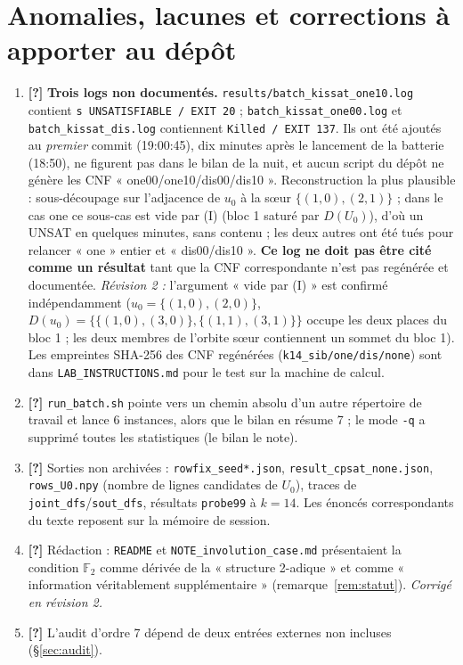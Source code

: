 \documentclass[11pt,a4paper]{article}
\theoremstyle{definition}
\theoremstyle{remark}
\newcommand{\F}{\mathbb{F}}
\newcommand{\st}[1]{\textbf{[#1]}}
\newcommand{\code}[1]{\texttt{#1}}
\begin{document}
\section{Anomalies, lacunes et corrections à apporter au dépôt}\label{sec:anomalies}
\begin{enumerate}[nosep]
\item \st{?} \textbf{Trois logs non documentés.} \code{results/batch\_kissat\_one10.log} contient \code{s UNSATISFIABLE / EXIT 20} ; \code{batch\_kissat\_one00.log} et \code{batch\_kissat\_dis.log} contiennent \code{Killed / EXIT 137}. Ils ont été ajoutés au \emph{premier} commit (19:00:45), dix minutes après le lancement de la batterie (18:50), ne figurent pas dans le bilan de la nuit, et aucun script du dépôt ne génère les CNF « one00/one10/dis00/dis10 ». Reconstruction la plus plausible : sous-découpage sur l'adjacence de $u_0$ à la sœur $\{(1,0),(2,1)\}$ ; dans le cas one ce sous-cas est vide par (I) (bloc 1 saturé par $D(U_0)$), d'où un UNSAT en quelques minutes, sans contenu ; les deux autres ont été tués pour relancer « one » entier et « dis00/dis10 ». \textbf{Ce log ne doit pas être cité comme un résultat} tant que la CNF correspondante n'est pas regénérée et documentée.
\emph{Révision 2 :} l'argument « vide par (I) » est confirmé indépendamment ($u_0=\{(1,0),(2,0)\}$, $D(u_0)=\{\{(1,0),(3,0)\},\{(1,1),(3,1)\}\}$ occupe les deux places du bloc 1 ; les deux membres de l'orbite sœur contiennent un sommet du bloc 1).
Les empreintes SHA-256 des CNF regénérées (\code{k14\_sib/one/dis/none}) sont dans \code{LAB\_INSTRUCTIONS.md} pour le test sur la machine de calcul.
\item \st{?} \code{run\_batch.sh} pointe vers un chemin absolu d'un autre répertoire de travail et lance 6 instances, alors que le bilan en résume 7 ; le mode \code{-q} a supprimé toutes les statistiques (le bilan le note).
\item \st{?} Sorties non archivées : \code{rowfix\_seed*.json}, \code{result\_cpsat\_none.json}, \code{rows\_U0.npy} (nombre de lignes candidates de $U_0$), traces de \code{joint\_dfs}/\code{sout\_dfs}, résultats \code{probe99} à $k=14$. Les énoncés correspondants du texte reposent sur la mémoire de session.
\item \st{?} Rédaction : \code{README} et \code{NOTE\_involution\_case.md} présentaient la condition $\F_2$ comme dérivée de la « structure 2-adique » et comme « information véritablement supplémentaire » (remarque~\ref{rem:statut}). \emph{Corrigé en révision 2.}
\item \st{?} L'audit d'ordre 7 dépend de deux entrées externes non incluses (§\ref{sec:audit}).

\end{enumerate}
\end{document}
